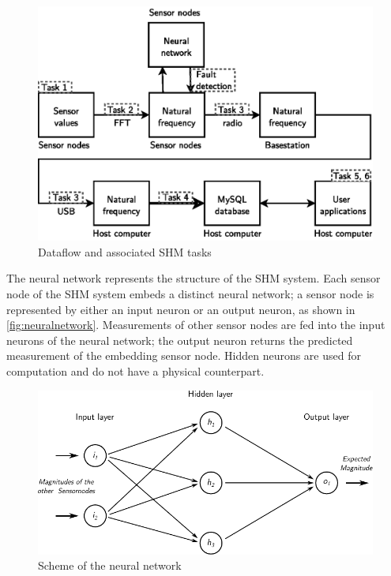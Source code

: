 \documentclass[12pt,a4paper]{scrartcl}
\begin{document}
\begin{figure}[hbt]
    \centering
    \includegraphics{figures/dataflow_tasks_nn.eps}
    \caption{Dataflow and associated SHM tasks}
    \label{fig:flow}
\end{figure}


The neural network represents the structure of the SHM system.
Each sensor node of the SHM system embeds a distinct neural network; a sensor node is represented by either an input neuron or an output neuron, as shown in \autoref{fig:neuralnetwork}.
Measurements of other sensor nodes are fed into the input neurons of the neural network; the output neuron returns the predicted measurement of the embedding sensor node.
Hidden neurons are used for computation and do not have a physical counterpart.

\begin{figure}[hbt]
    \centering
    \includegraphics{figures/neuralnetwork.pdf}
    \caption{Scheme of the neural network}
    \label{fig:neuralnetwork}
\end{figure}
\end{document}
